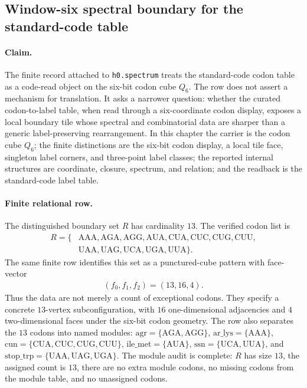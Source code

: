 
\subsection{Window-six spectral boundary for the standard-code table}
\label{subsec:h0-spectrum-window-six-boundary}

\paragraph{Claim.}
The finite record attached to \texttt{h0.spectrum} treats the standard-code codon table as a code-read object on the six-bit codon cube $Q_6$. The row does not assert a mechanism for translation. It asks a narrower question: whether the curated codon-to-label table, when read through a six-coordinate codon display, exposes a local boundary tile whose spectral and combinatorial data are sharper than a generic label-preserving rearrangement. In this chapter the carrier is the codon cube $Q_6$; the finite distinctions are the six-bit codon display, a local tile face, singleton label corners, and three-point label classes; the reported internal structures are coordinate, closure, spectrum, and relation; and the readback is the standard-code label table.

\paragraph{Finite relational row.}
The distinguished boundary set $R$ has cardinality $13$. The verified codon list is
$$
\begin{aligned}
R=\{&\mathrm{AAA},\mathrm{AGA},\mathrm{AGG},\mathrm{AUA},\mathrm{CUA},\mathrm{CUC},\mathrm{CUG},\mathrm{CUU},\\
&\mathrm{UAA},\mathrm{UAG},\mathrm{UCA},\mathrm{UGA},\mathrm{UUA}\}.
\end{aligned}
$$
The same finite row identifies this set as a punctured-cube pattern with face-vector
$$
\begin{aligned}
(f_0,f_1,f_2)=(13,16,4).
\end{aligned}
$$
Thus the data are not merely a count of exceptional codons. They specify a concrete $13$-vertex subconfiguration, with $16$ one-dimensional adjacencies and $4$ two-dimensional faces under the six-bit codon geometry. The row also separates the $13$ codons into named modules: $\mathrm{agr}=\{\mathrm{AGA},\mathrm{AGG}\}$, $\mathrm{ar\_lys}=\{\mathrm{AAA}\}$, $\mathrm{cun}=\{\mathrm{CUA},\mathrm{CUC},\mathrm{CUG},\mathrm{CUU}\}$, $\mathrm{ile\_met}=\{\mathrm{AUA}\}$, $\mathrm{ssn}=\{\mathrm{UCA},\mathrm{UUA}\}$, and $\mathrm{stop\_trp}=\{\mathrm{UAA},\mathrm{UAG},\mathrm{UGA}\}$. The module audit is complete: $R$ has size $13$, the assigned count is $13$, there are no extra module codons, no missing codons from the module table, and no unassigned codons.

